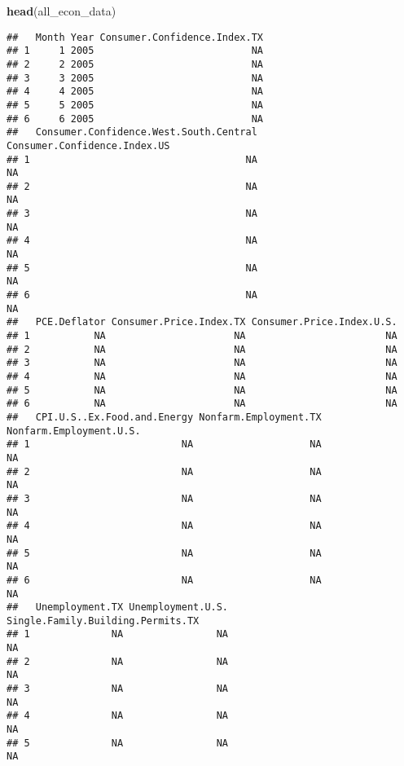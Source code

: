 \documentclass[
]{article}
\newenvironment{Shaded}{\begin{snugshade}}{\end{snugshade}}
\newcommand{\FunctionTok}[1]{\textcolor[rgb]{0.13,0.29,0.53}{\textbf{#1}}}
\newcommand{\NormalTok}[1]{#1}
\begin{document}
\begin{Shaded}
\begin{Highlighting}[]
\FunctionTok{head}\NormalTok{(all\_econ\_data)}
\end{Highlighting}
\end{Shaded}

\begin{verbatim}
##   Month Year Consumer.Confidence.Index.TX
## 1     1 2005                           NA
## 2     2 2005                           NA
## 3     3 2005                           NA
## 4     4 2005                           NA
## 5     5 2005                           NA
## 6     6 2005                           NA
##   Consumer.Confidence.West.South.Central Consumer.Confidence.Index.US
## 1                                     NA                           NA
## 2                                     NA                           NA
## 3                                     NA                           NA
## 4                                     NA                           NA
## 5                                     NA                           NA
## 6                                     NA                           NA
##   PCE.Deflator Consumer.Price.Index.TX Consumer.Price.Index.U.S.
## 1           NA                      NA                        NA
## 2           NA                      NA                        NA
## 3           NA                      NA                        NA
## 4           NA                      NA                        NA
## 5           NA                      NA                        NA
## 6           NA                      NA                        NA
##   CPI.U.S..Ex.Food.and.Energy Nonfarm.Employment.TX Nonfarm.Employment.U.S.
## 1                          NA                    NA                      NA
## 2                          NA                    NA                      NA
## 3                          NA                    NA                      NA
## 4                          NA                    NA                      NA
## 5                          NA                    NA                      NA
## 6                          NA                    NA                      NA
##   Unemployment.TX Unemployment.U.S. Single.Family.Building.Permits.TX
## 1              NA                NA                                NA
## 2              NA                NA                                NA
## 3              NA                NA                                NA
## 4              NA                NA                                NA
## 5              NA                NA                                NA

\end{verbatim}
\end{document}
